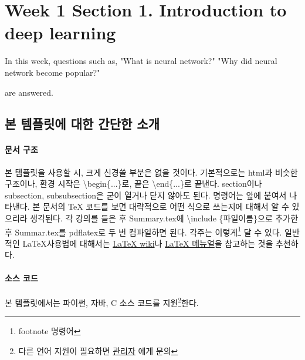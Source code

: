
\section{Week 1 Section 1. Introduction to deep learning} 

In this week, questions such as,
\circ "What is neural network?"
\circ "Why did neural network become popular?"

are answered.

\subsection{본 템플릿에 대한 간단한 소개}

\paragraph{문서 구조} 본 템플릿을 사용할 시, 크게 신경쓸 부분은 없을 것이다. 기본적으로는 html과 비슷한 구조이나, 환경 시작은 {\textbackslash}begin\{...\}로, 끝은 {\textbackslash}end\{...\}로 끝낸다. section이나 subsection, subsubsection은 굳이 열거나 닫지 않아도 된다. 명령어는  앞에 붙여서 나타낸다. 본 문서의 TeX 코드를 보면 대략적으로 어떤 식으로 쓰는지에 대해서 알 수 있으리라 생각된다. 각 강의를 들은 후 Summary.tex에 \textbackslash include \{파일이름\}으로 추가한 후 Summar.tex를 pdflatex로 두 번 컴파일하면 된다. 각주는 이렇게\footnote{footnote 명령어} 달 수 있다. 일반적인 \LaTeX 사용법에 대해서는 \href{http://legacy-wiki.dgoon.net/doku.php?id=latex:latex}{LaTeX wiki}나 \href{http://ftp.isu.edu.tw/pub/Unix/CTAN/info/lshort/korean/lshort-kr.pdf}{LaTeX 메뉴얼}을 참고하는 것을 추천하다.

\paragraph{소스 코드} 본 템플릿에서는 파이썬, 자바, C 소스 코드를 지원\footnote{다른 언어 지원이 필요하면 \href{mailto:principia\_12@kaist.ac.kr}{관리자} 에게 문의}한다. 


